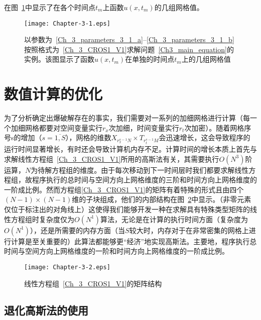 \documentclass[twoside]{book}
\begin{document}
\begin{CJK*}{GBK}{song}
在图~\ref{Fig_3_1}中显示了在各个时间点$t_m$上函数$u(x,t_m)$的几组网格值。
\begin{figure}[t]
	\centering
	\texttt{[image: Chapter-3-1.eps]}\\
\caption{以参数为~\eqref{Ch_3_parameters_3_1_a}--\eqref{Ch_3_parameters_3_1_b}按照格式为~\eqref{Ch_3_CROS1_V1}求解问题~\eqref{Ch3_main_equation}的实例。该图显示了函数$u(x,t_m)$在单独的时间点$t_m$上的几组网格值}
\label{Fig_3_1}
\end{figure}




\section{数值计算的优化}

为了分析确定出爆破解存在的事实，我们需要对一系列的加细网格进行计算（每一个加细网格都要对空间变量实行$r_x$次加细，时间变量实行$r_t$次加密）。随着网格序号s的增加（$s=\overline{1,S}$），网格的维数$X_{r_x^{s - 1}N} \times T_{r_t^{s - 1}M}$会迅速增长，这会导致程序的运行时间显著增长，有时还会导致计算机内存不足。计算时间的增长本质上首先与求解线性方程组~\eqref{Ch_3_CROS1_V1}所用的高斯法有关，其需要执行$O(N^3)$阶运算，$N$为待解方程组的维度。由于每次移动到下一时间层时我们都要求解线性方程组，故程序执行的总时间与空间方向上网格维度的三阶和时间方向上网格维度的一阶成比例。然而方程组\eqref{Ch_3_CROS1_V1}的矩阵有着特殊的形式且由四个$(N - 1) \times(N - 1)$维的子块组成，他们的内部结构在图~\ref{Ch_3_Structure_of_the_matrix_V1}中显示。（非零元素仅位于标注出的对角线上）这使得我们能够开发一种在求解具有特殊类型矩阵的线性方程组时复杂度仅为$O(N^1)$算法，无论是在计算的执行时间方面（复杂度为$O(N^1)$），还是所需要的内存方面（当$S$较大时，内存对于在非常密集的网格上进行计算是至关重要的）此算法都能够更“经济”地实现高斯法。主要地，程序执行总时间与空间方向上网格维度的一阶和时间方向上网格维度的一阶成比例。
\begin{figure}[t]
	\centering
	\texttt{[image: Chapter-3-2.eps]}\\
	\caption{线性方程组~\eqref{Ch_3_CROS1_V1}的矩阵结构}
	\label{Ch_3_Structure_of_the_matrix_V1}
\end{figure}


\subsection{退化高斯法的使用} \label{sweep_method}


\end{CJK*}
\end{document}

